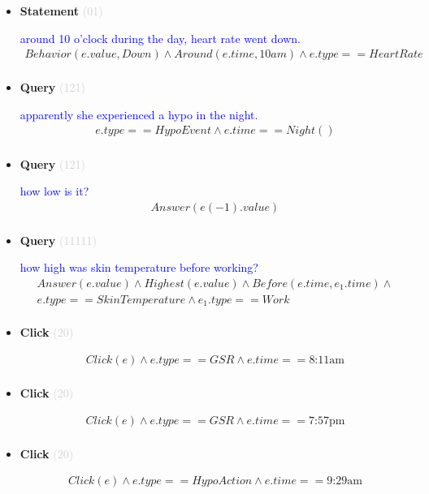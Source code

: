 \documentclass[11pt]{article}
\newcommand{\key}[1]{\textcolor{lightgray}{#1}}
\newcounter{CQuery}
\newcounter{CStatement}
\newcounter{CClick}
\begin{document}
\begin{itemize}
\item
\textbf{Statement\theCStatement} \key{(01)} \addtocounter{CStatement}{1}
\textcolor{blue}{ around 10 o'clock during the day, heart rate went down. }
\begin{multline*}
Behavior(e.value, Down) \wedge Around(e.time, 10am) \wedge e.type==HeartRate \\ 
\end{multline*}


\item
\textbf{Query\theCQuery} \key{(121)} \addtocounter{CQuery}{1}
\textcolor{blue}{ apparently she experienced a hypo in the night. }
\begin{multline*}
e.type==HypoEvent \wedge e.time==Night() \\ 
\end{multline*}


\item
\textbf{Query\theCQuery} \key{(121)} \addtocounter{CQuery}{1}
\textcolor{blue}{ how low is it? }
\begin{multline*}
Answer(e(-1).value) \\ 
\end{multline*}


\item
\textbf{Query\theCQuery} \key{(11111)} \addtocounter{CQuery}{1}
\textcolor{blue}{ how high was skin temperature before working? }
\begin{multline*}
Answer(e.value) \wedge Highest(e.value) \wedge Before(e.time, e_1.time) \wedge \\ 
e.type==SkinTemperature \wedge e_1.type==Work \\ 
\end{multline*}


\item
\textbf{Click\theCClick} \key{(20)} \addtocounter{CClick}{1}
\textcolor{blue}{  }
\begin{multline*}
Click(e) \wedge e.type==GSR \wedge e.time==\mbox{8:11am} \\ 
\end{multline*}


\item
\textbf{Click\theCClick} \key{(20)} \addtocounter{CClick}{1}
\textcolor{blue}{  }
\begin{multline*}
Click(e) \wedge e.type==GSR \wedge e.time==\mbox{7:57pm} \\ 
\end{multline*}


\item
\textbf{Click\theCClick} \key{(20)} \addtocounter{CClick}{1}
\textcolor{blue}{  }
\begin{multline*}
Click(e) \wedge e.type==HypoAction \wedge e.time==\mbox{9:29am} \\ 
\end{multline*}



\end{itemize}
\end{document}
